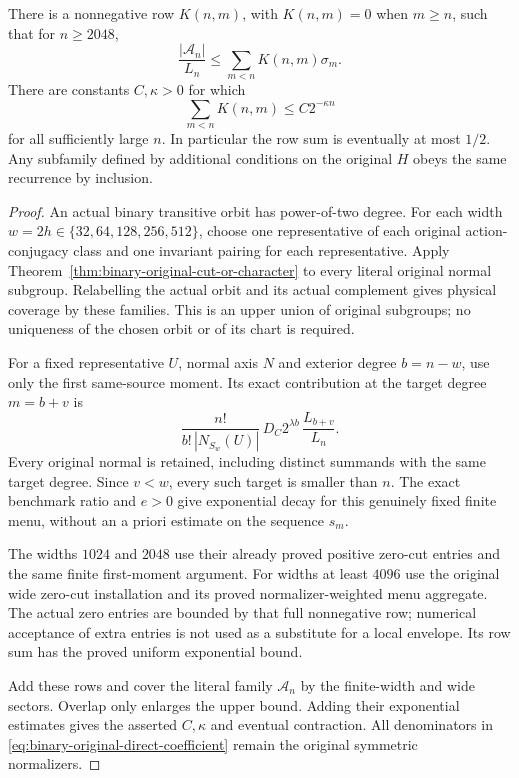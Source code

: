 \begin{theorem}
\label{thm:binary-original-ordinary-recurrence}
There is a nonnegative row $K(n,m)$, with $K(n,m)=0$ when $m\geq n$,
such that for $n\geq2048$,
\begin{equation}\label{eq:binary-original-ordinary-recurrence}
 \frac{|\mathcal A_n|}{L_n}
 \leq\sum_{m<n}K(n,m)\sigma_m.
\end{equation}
There are constants $C,\kappa>0$ for which
\[
 \sum_{m<n}K(n,m)\leq C2^{-\kappa n}
\]
for all sufficiently large $n$. In particular the row sum is eventually
at most $1/2$. Any subfamily defined by additional conditions on the
original $H$ obeys the same recurrence by inclusion.
\end{theorem}
\begin{proof}
An actual binary transitive orbit has power-of-two degree. For each
width $w=2h\in\{32,64,128,256,512\}$, choose one representative of
each original action-conjugacy class and one invariant pairing for
each representative. Apply Theorem~\ref{thm:binary-original-cut-or-character}
to every literal original normal subgroup. Relabelling the actual
orbit and its actual complement gives physical coverage by these
families. This is an upper union of original subgroups; no uniqueness
of the chosen orbit or of its chart is required.

For a fixed representative $U$, normal axis $N$ and exterior degree
$b=n-w$, use only the first same-source moment. Its exact contribution
at the target degree $m=b+v$ is
\begin{equation}\label{eq:binary-original-direct-coefficient}
 \frac{n!}{b!\,|N_{S_w}(U)|}\,
 D_C2^{\lambda b}\,
 \frac{L_{b+v}}{L_n}.
\end{equation}
Every original normal is retained, including distinct summands with
the same target degree. Since $v<w$, every such target is smaller than
$n$. The exact benchmark ratio and $e>0$ give exponential decay for
this genuinely fixed finite menu, without an a priori estimate on
the sequence $s_m$.

The widths $1024$ and $2048$ use their already proved positive zero-cut
entries and the same finite first-moment argument. For widths at least
 $4096$ use the original wide zero-cut installation and its proved
normalizer-weighted menu aggregate. The actual zero entries are bounded
by that full nonnegative row; numerical acceptance of extra entries
is not used as a substitute for a local envelope. Its row sum has the
proved uniform exponential bound.

Add these rows and cover the literal family $\mathcal A_n$ by the
finite-width and wide sectors. Overlap only enlarges the upper bound.
Adding their exponential estimates gives the asserted $C,\kappa$ and
eventual contraction. All denominators in
\eqref{eq:binary-original-direct-coefficient} remain the original
symmetric normalizers.
\end{proof}

